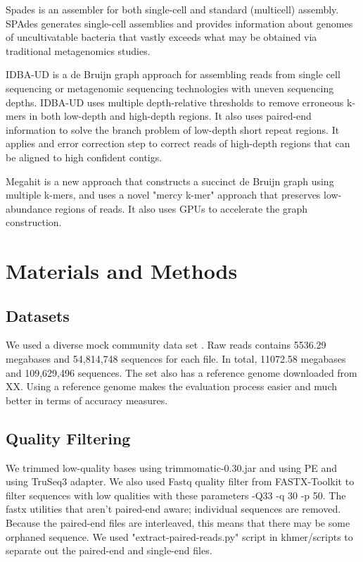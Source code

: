 Spades \cite{spades} is an assembler for both single-cell and standard (multicell) assembly. SPAdes generates single-cell assemblies and provides information about genomes of uncultivatable bacteria that vastly exceeds what may be obtained via traditional metagenomics studies. 

IDBA-UD \cite{idba} is a de Bruijn graph approach for assembling reads from single cell sequencing or metagenomic sequencing technologies with uneven sequencing depths. IDBA-UD uses multiple depth-relative thresholds to remove erroneous k-mers in both low-depth and high-depth regions. It also uses paired-end information  to solve the branch problem of low-depth short repeat regions. It applies and error correction step to correct reads of high-depth regions that can be aligned to high confident contigs.


Megahit \cite{megahit} is a new approach that constructs a succinct de Bruijn graph using multiple k-mers, and uses a novel "mercy k-mer" approach that preserves low-abundance regions of reads. It also uses GPUs to accelerate the graph construction.
 

\section*{Materials and Methods}

\subsection*{Datasets}

We used a diverse mock community data set \cite{podar}. Raw reads contains 5536.29 megabases and 54,814,748 sequences for each file. In total, 11072.58  megabases and 109,629,496 sequences. The set also has a reference genome downloaded from XX.  Using a reference genome makes the evaluation process easier and much better in terms of accuracy measures. 

\subsection*{Quality Filtering} 
We trimmed low-quality bases using trimmomatic-0.30.jar \cite {trim} and using PE and using TruSeq3  adapter.
We also used Fastq quality filter  from FASTX-Toolkit to filter sequences with low qualities with these parameters -Q33 -q 30 -p 50.
The fastx utilities that aren’t paired-end aware; individual sequences are removed. Because the paired-end files are interleaved, this means that there may be some orphaned sequence. We used  "extract-paired-reads.py" script in khmer/scripts to separate out the paired-end and single-end files.

